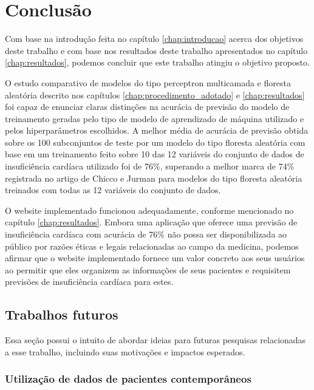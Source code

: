 \chapter{Conclusão} \label{chap:conclusao}

Com base na introdução feita no capítulo \ref{chap:introducao} acerca dos objetivos deste trabalho e com base nos resultados deste trabalho apresentados no capítulo \ref{chap:resultados}, podemos concluir que este trabalho atingiu o objetivo proposto.

O estudo comparativo de modelos do tipo perceptron multicamada e floresta aleatória descrito nos capítulos \ref{chap:procedimento_adotado} e \ref{chap:resultados} foi capaz de enunciar claras distinções na acurácia de previsão do modelo de treinamento geradas pelo tipo de modelo de aprendizado de máquina utilizado e pelos hiperparâmetros escolhidos. A melhor média de acurácia de previsão obtida sobre os 100 subconjuntos de teste por um modelo do tipo floresta aleatória com base em um treinamento feito sobre 10 das 12 variáveis do conjunto de dados de insuficiência cardíaca utilizado\cite{larxel_dataset} foi de 76\%, superando a melhor marca de 74\% registrada no artigo de Chicco e Jurman\cite{chicco2020} para modelos do tipo floresta aleatória treinados com todas as 12 variáveis do conjunto de dados.

O website implementado funcionou adequadamente, conforme mencionado no capítulo \ref{chap:resultados}. Embora uma aplicação que oferece uma previsão de insuficiência cardíaca com acurácia de 76\% não possa ser disponibilizada ao público por razões éticas e legais relacionadas ao campo da medicina, podemos afirmar que o website implementado fornece um valor concreto aos seus usuários ao permitir que eles organizem as informações de seus pacientes e requisitem previsões de insuficiência cardíaca para estes.

\section{Trabalhos futuros}

Essa seção possui o intuito de abordar ideias para futuras pesquisas relacionadas a esse trabalho, incluindo suas motivações e impactos esperados.

\subsection{Utilização de dados de pacientes contemporâneos}


